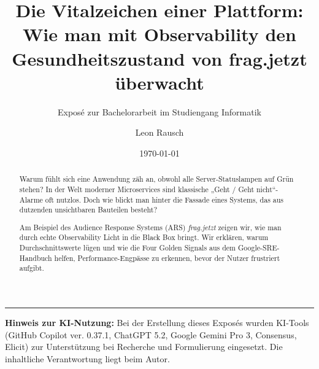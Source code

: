 \documentclass[%
   final,%
   paper=a4,%
   pagesize=auto,%
   fontsize=10pt,%
   twocolumn,%
   version=last,%
   parskip=half%
]{scrartcl}
\author{Leon Rausch}
\title{Die Vitalzeichen einer Plattform: Wie man mit Observability den Gesundheitszustand von frag.jetzt überwacht}
\subtitle{Exposé zur Bachelorarbeit im Studiengang Informatik}
\date{\today}
\begin{document}
\maketitle


\begin{abstract}
\noindent
Warum fühlt sich eine Anwendung zäh an, obwohl alle Server-Statuslampen auf Grün stehen? In der Welt moderner Microservices sind klassische „Geht / Geht nicht“-Alarme oft nutzlos. Doch wie blickt man hinter die Fassade eines Systems, das aus dutzenden unsichtbaren Bauteilen besteht?

Am Beispiel des Audience Response Systems (ARS) \emph{frag.jetzt} zeigen wir, wie man durch echte Observability Licht in die Black Box bringt. Wir erklären, warum Durchschnittswerte lügen und wie die Four Golden Signals aus dem Google-SRE-Handbuch helfen, Performance-Engpässe zu erkennen, bevor der Nutzer frustriert aufgibt.
\end{abstract}



\printbibliography[title=Quellen und weiterführende Literatur]

\vspace{1em}
\noindent\rule{\columnwidth}{0.4pt}
{\footnotesize\textbf{Hinweis zur KI-Nutzung:} Bei der Erstellung dieses Exposés wurden KI-Tools (GitHub Copilot ver. 0.37.1, ChatGPT 5.2, Google Gemini Pro 3, Consensus, Elicit) zur Unterstützung bei Recherche und Formulierung eingesetzt. Die inhaltliche Verantwortung liegt beim Autor.}
\end{document}
